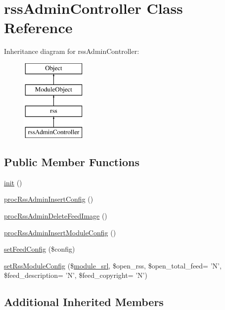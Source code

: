 \hypertarget{classrssAdminController}{\section{rss\-Admin\-Controller Class Reference}
\label{classrssAdminController}
}
Inheritance diagram for rss\-Admin\-Controller\-:\begin{figure}[H]
\begin{center}
\leavevmode
\includegraphics[height=4.000000cm]{classrssAdminController}
\end{center}
\end{figure}
\subsection*{Public Member Functions}
\begin{DoxyCompactItemize}
\item 
\hyperlink{classrssAdminController_ad73e127c3d6191b7d82e2fd3f50ef477}{init} ()
\item 
\hyperlink{classrssAdminController_abacdc1717d07ac5cfe2d4bb83f08d310}{proc\-Rss\-Admin\-Insert\-Config} ()
\item 
\hyperlink{classrssAdminController_a37eed33f761ae0a1cdcce49562bed601}{proc\-Rss\-Admin\-Delete\-Feed\-Image} ()
\item 
\hyperlink{classrssAdminController_ae07c8748cdccb2d13dfb4140e9c13aeb}{proc\-Rss\-Admin\-Insert\-Module\-Config} ()
\item 
\hyperlink{classrssAdminController_a57c67e2413e7d6491f090975531094cd}{set\-Feed\-Config} (\$config)
\item 
\hyperlink{classrssAdminController_a4dfe5a37da285c2421b574923a5bcbf8}{set\-Rss\-Module\-Config} (\$\hyperlink{ko_8install_8php_a370bb6450fab1da3e0ed9f484a38b761}{module\-\_\-srl}, \$open\-\_\-rss, \$open\-\_\-total\-\_\-feed= 'N', \$feed\-\_\-description= 'N', \$feed\-\_\-copyright= 'N')
\end{DoxyCompactItemize}
\subsection*{Additional Inherited Members}


